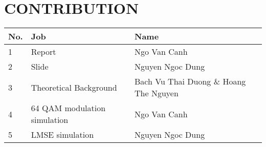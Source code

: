 \section*{CONTRIBUTION}
 {}

\begin{table}[!ht]
\begin{tabular}{|l|l|l|}
    \hline
    \textbf{No.}    & \textbf{Job}      & \textbf{Name} \\ \hline
    1 & Report & Ngo Van Canh  \\ \hline
    2 & Slide & Nguyen Ngoc Dung \\ \hline
    3 & Theoretical Background & Bach Vu Thai Duong \& Hoang The Nguyen \\ \hline
    4 & 64 QAM modulation simulation & Ngo Van Canh \\ \hline
    5 & LMSE simulation & Nguyen Ngoc Dung \\ \hline
\end{tabular}
\end{table}

\newpage